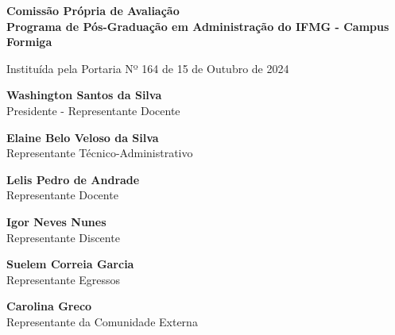\begin{center}
    \vspace*{2cm}
    {\Large\textbf{Comissão Própria de Avaliação}}\\
    \vspace{0.3cm}
    {\Large\textbf{Programa de Pós-Graduação em
Administração do IFMG - Campus Formiga}}
    
    \vspace{0.5cm}
    {\small Instituída pela Portaria Nº 164 de 15 de Outubro de 2024}
    
    \vspace{2cm}
    
    \begin{minipage}{0.8\textwidth}
        \centering
        \textbf{Washington Santos da Silva}\\
        Presidente - Representante Docente
        
        \vspace{1cm}
        
        \textbf{Elaine Belo Veloso da Silva}\\
        Representante Técnico-Administrativo
        
        \vspace{1cm}
        
        \textbf{Lelis Pedro de Andrade}\\
        Representante Docente
        
        \vspace{1cm}
        
        \textbf{Igor Neves Nunes}\\
        Representante Discente
        
        \vspace{1cm}
        
        \textbf{Suelem Correia Garcia}\\
        Representante Egressos
        
        \vspace{1cm}
        
        \textbf{Carolina Greco}\\
        Representante da Comunidade Externa
    \end{minipage}
\end{center}


\clearpage
{}


